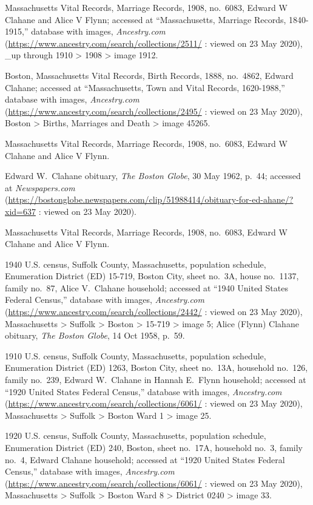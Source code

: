 \begin{thebibliography}{999}
Massachusetts Vital Records, Marriage Records, 1908, no.\ 6083, Edward W Clahane and Alice V Flynn; accessed at ``Massachusetts, Marriage Records, 1840-1915,'' database with images, \textit{Ancestry.com} (\url{https://www.ancestry.com/search/collections/2511/} : viewed on 23 May 2020), \_up through 1910 > 1908 > image 1912.

Boston, Massachusetts Vital Records, Birth Records, 1888, no.\ 4862, Edward Clahane; accessed at ``Massachusetts, Town and Vital Records, 1620-1988,'' database with images, \textit{Ancestry.com} (\url{https://www.ancestry.com/search/collections/2495/} : viewed on 23 May 2020), Boston > Births, Marriages and Death > image 45265.

Massachusetts Vital Records, Marriage Records, 1908, no.\ 6083, Edward W Clahane and Alice V Flynn.

Edward W.\ Clahane obituary, \textit{The Boston Globe}, 30 May 1962, p.\ 44; accessed at \textit{Newspapers.com} (\url{https://bostonglobe.newspapers.com/clip/51988414/obituary-for-ed-ahane/?xid=637} : viewed on 23 May 2020).

Massachusetts Vital Records, Marriage Records, 1908, no.\ 6083, Edward W Clahane and Alice V Flynn.

1940 U.S. census, Suffolk County, Massachusetts, population schedule, Enumeration District (ED) 15-719, Boston City, sheet no.\ 3A, house no.\ 1137, family no.\ 87, Alice V.\ Clahane household; accessed at ``1940 United States Federal Census,'' database with images, \textit{Ancestry.com} (\url{https://www.ancestry.com/search/collections/2442/} : viewed on 23 May 2020), Massachusetts > Suffolk > Boston > 15-719 > image 5; Alice (Flynn) Clahane obituary, \textit{The Boston Globe}, 14 Oct 1958, p.\ 59.

1910 U.S. census, Suffolk County, Massachusetts, population schedule, Enumeration District (ED) 1263, Boston City, sheet no.\ 13A, household no.\ 126, family no.\ 239, Edward W.\ Clahane in Hannah E.\ Flynn household; accessed at ``1920 United States Federal Census,'' database with images, \textit{Ancestry.com} (\url{https://www.ancestry.com/search/collections/6061/} : viewed on 23 May 2020), Massachusetts > Suffolk > Boston Ward 1 > image 25.

1920 U.S. census, Suffolk County, Massachusetts, population schedule, Enumeration District (ED) 240, Boston, sheet no.\ 17A, household no.\ 3, family no.\ 4, Edward Clahane household; accessed at ``1920 United States Federal Census,'' database with images, \textit{Ancestry.com} (\url{https://www.ancestry.com/search/collections/6061/} : viewed on 23 May 2020), Massachusetts > Suffolk > Boston Ward 8 > District 0240 > image 33.


\end{thebibliography}
